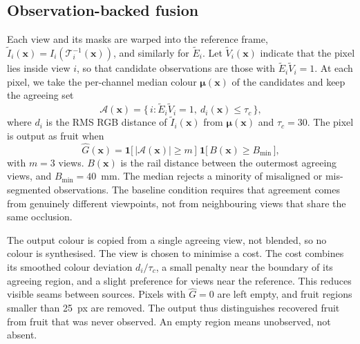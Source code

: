 \subsection{Observation-backed fusion}\label{sec:fusion}
Each view and its masks are warped into the reference frame, $\tilde I_i(\mathbf{x}) = I_i(\mathcal{T}_i^{-1}(\mathbf{x}))$, and similarly for $\tilde E_i$. Let $\tilde V_i(\mathbf{x})$ indicate that the pixel lies inside view $i$, so that candidate observations are those with $\tilde E_i \tilde V_i = 1$. At each pixel, we take the per-channel median colour $\boldsymbol{\mu}(\mathbf{x})$ of the candidates and keep the agreeing set
\begin{equation}
 \mathcal{A}(\mathbf{x}) = \big\{\, i : \tilde E_i\tilde V_i = 1,\ d_i(\mathbf{x}) \le \tau_c \,\big\},
 \label{eq:agree}
\end{equation}
where $d_i$ is the RMS RGB distance of $\tilde I_i(\mathbf{x})$ from $\boldsymbol{\mu}(\mathbf{x})$ and $\tau_c=30$. The pixel is output as fruit when
\begin{equation}
 \hat G(\mathbf{x}) = \mathbf{1}\big[\,|\mathcal{A}(\mathbf{x})| \ge m\,\big]\;
 \mathbf{1}\big[\,B(\mathbf{x}) \ge B_{\min}\,\big],
 \label{eq:fusion}
\end{equation}
with $m=3$ views. $B(\mathbf{x})$ is the rail distance between the outermost agreeing views, and $B_{\min}=40$~mm. The median rejects a minority of misaligned or mis-segmented observations. The baseline condition requires that agreement comes from genuinely different viewpoints, not from neighbouring views that share the same occlusion.

The output colour is copied from a single agreeing view, not blended, so no colour is synthesised. The view is chosen to minimise a cost. The cost combines its smoothed colour deviation $d_i/\tau_c$, a small penalty near the boundary of its agreeing region, and a slight preference for views near the reference. This reduces visible seams between sources. Pixels with $\hat G=0$ are left empty, and fruit regions smaller than 25~px are removed. The output thus distinguishes recovered fruit from fruit that was never observed. An empty region means unobserved, not absent.

